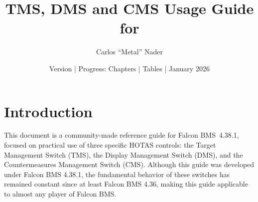 \documentclass[11pt, a4paper, twoside]{report}
\title{TMS, DMS and CMS Usage Guide for \bmsver}
\author{Carlos ``Metal'' Nader}
\date{Version \fulldocversion{} | Progress: Chapters \chapterscompletedof{} | Tables \tablesfilledpct{} | January 2026}
\providecommand{\bmsver}{Falcon BMS~4.38.1}
\begin{document}
\maketitle


\setcounter{tocdepth}{3}       %
\setcounter{secnumdepth}{3}    %

\newpage
\tableofcontents
\newpage
{}

\chapter{Introduction}
\label{chap:C1}

This document is a community-made reference guide for \bmsver, focused on practical use of three specific HOTAS controls: the Target Management Switch (TMS), the Display Management Switch (DMS), and the Countermeasures Management Switch (CMS). Although this guide was developed under Falcon BMS 4.38.1, the fundamental behavior of these switches has remained constant since at least Falcon BMS 4.36, making this guide applicable to almost any player of Falcon BMS.
\end{document}
